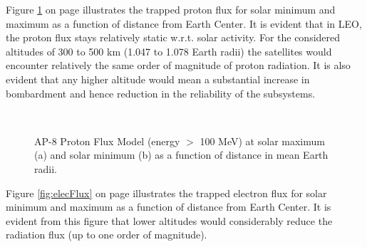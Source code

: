 Figure \ref{fig:protFlux} on page \pageref{fig:protFlux} illustrates the trapped proton flux for solar minimum and maximum as a function of distance from Earth Center. It is evident that in \ac{LEO}, the proton flux stays relatively static w.r.t. solar activity. For the considered altitudes of 300 to 500 km (1.047 to 1.078 Earth radii) the satellites would encounter relatively the same order of magnitude of proton radiation. It is also evident that any higher altitude would mean a substantial increase in bombardment and hence reduction in the reliability of the subsystems.   

\begin{figure}
  \centering
  \\                
  \caption{AP-8 Proton Flux Model (energy $>$ 100 MeV) at solar maximum (a) and solar minimum (b) as a function of distance in mean Earth radii.}
  \label{fig:protFlux}
\end{figure}

Figure \ref{fig:elecFlux} on page \pageref{fig:elecFlux} illustrates the trapped electron flux for solar minimum and maximum as a function of distance from Earth Center. It is evident from this figure that lower altitudes would considerably reduce the radiation flux (up to one order of magnitude).

